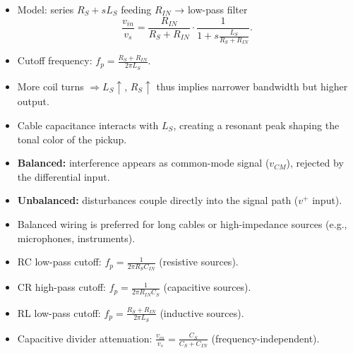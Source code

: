 \begin{tcolorbox}[colback=gray!10,colframe=black,title=Summary: Inductive Sources (e.g., guitar pickups)]
\begin{itemize}
    \item Model: series $R_S + sL_S$ feeding $R_{IN}$ → low-pass filter
    \[
        \frac{v_{in}}{v_s} = \frac{R_{IN}}{R_S + R_{IN}} \cdot \frac{1}{1 + s \frac{L_S}{R_S + R_{IN}}}.
    \]
    \item Cutoff frequency: $\displaystyle f_p = \frac{R_S + R_{IN}}{2\pi L_S}$.
    \item More coil turns $\Rightarrow L_S \uparrow$, $R_S \uparrow$ thus implies narrower bandwidth but higher output.
    \item Cable capacitance interacts with $L_S$, creating a resonant peak shaping the tonal color of the pickup.
\end{itemize}
\end{tcolorbox}

\begin{tcolorbox}[colback=gray!10,colframe=black,title=Summary: Balanced vs Unbalanced Connections]
\begin{itemize}
    \item \textbf{Balanced:} interference appears as common-mode signal ($v_{CM}$), rejected by the differential input.  
    \item \textbf{Unbalanced:} disturbances couple directly into the signal path ($v^+$ input).  
    \item Balanced wiring is preferred for long cables or high-impedance sources (e.g., microphones, instruments).
\end{itemize}
\end{tcolorbox}

\begin{tcolorbox}[colback=gray!10,colframe=black,title=Summary: Quick Reference Formulas]
\begin{itemize}
    \item RC low-pass cutoff: $\displaystyle f_p = \frac{1}{2\pi R_S C_{IN}}$ (resistive sources).  
    \item CR high-pass cutoff: $\displaystyle f_p = \frac{1}{2\pi R_{IN} C_S}$ (capacitive sources).  
    \item RL low-pass cutoff: $\displaystyle f_p = \frac{R_S + R_{IN}}{2\pi L_S}$ (inductive sources).  
    \item Capacitive divider attenuation: $\displaystyle \frac{v_{in}}{v_s} = \frac{C_S}{C_S + C_{IN}}$ (frequency-independent).  
\end{itemize}
\end{tcolorbox}
